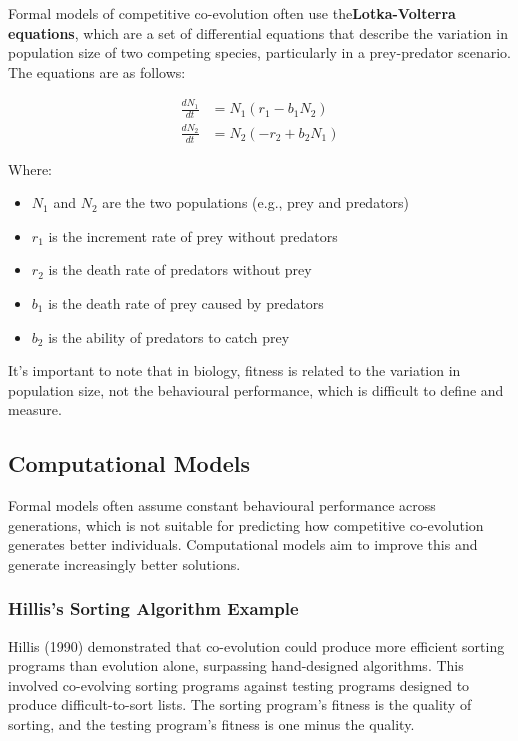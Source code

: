 Formal models of competitive co-evolution often use the\textbf{Lotka-Volterra equations}, which are a set of differential equations that describe the variation in population size of two competing species, particularly in a prey-predator scenario. The equations are as follows:

\begin{align*}
    \frac{dN_1}{dt} &= N_1(r_1 - b_1N_2) \\
    \frac{dN_2}{dt} &= N_2(-r_2 + b_2N_1)
\end{align*}

Where:
\begin{itemize}
    \item $N_1$ and $N_2$ are the two populations (e.g., prey and predators)
    \item $r_1$ is the increment rate of prey without predators
    \item $r_2$ is the death rate of predators without prey
    \item $b_1$ is the death rate of prey caused by predators
    \item $b_2$ is the ability of predators to catch prey
\end{itemize}
It's important to note that in biology, fitness is related to the variation in population size, not the behavioural performance, which is difficult to define and measure.

\subsection*{Computational Models}

Formal models often assume constant behavioural performance across generations, which is not suitable for predicting how competitive co-evolution generates better individuals. Computational models aim to improve this and generate increasingly better solutions.

\subsubsection*{Hillis's Sorting Algorithm Example}
Hillis (1990) demonstrated that co-evolution could produce more efficient sorting programs than evolution alone, surpassing hand-designed algorithms. This involved co-evolving sorting programs against testing programs designed to produce difficult-to-sort lists. The sorting program's fitness is the quality of sorting, and the testing program’s fitness is one minus the quality.


